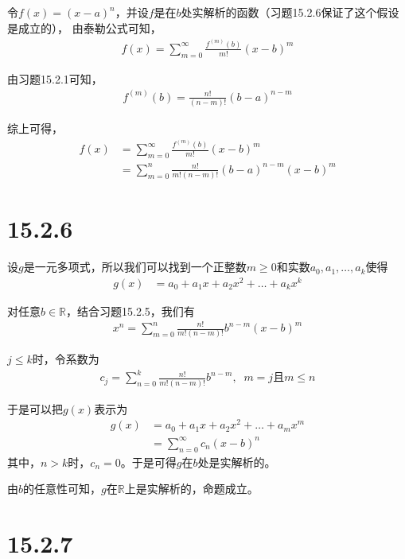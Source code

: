 \documentclass{article}
\begin{document}
令$f(x) = (x - a)^n$，并设$f$是在$b$处实解析的函数（习题15.2.6保证了这个假设是成立的），
由泰勒公式可知，
\begin{align*}
  f(x) = \sum\limits_{m = 0}^\infty \frac{f^{(m)}(b)}{m!}(x - b)^m
\end{align*}

由习题15.2.1可知，
\begin{align*}
  f^{(m)}(b) = \frac{n!}{(n - m)!}(b - a)^{n - m}
\end{align*}

综上可得，
\begin{align*}
  f(x) & = \sum\limits_{m = 0}^\infty \frac{f^{(m)}(b)}{m!}(x - b)^m            \\
       & = \sum\limits_{m = 0}^n \frac{n!}{m!(n - m)!} (b - a)^{n - m}(x - b)^m
\end{align*}

\section*{15.2.6}

设$g$是一元多项式，所以我们可以找到一个正整数$m \geq 0$和实数$a_0, a_1, \dots, a_k$使得
\begin{align*}
  g(x) & = a_0 + a_1x + a_2x^2 + \dots + a_kx^k
\end{align*}

对任意$b \in \mathbb{R}$，结合习题15.2.5，我们有
\begin{align*}
  x^n = \sum\limits_{m = 0}^n \frac{n!}{m!(n - m)!} b^{n - m}(x - b)^m
\end{align*}

$j \leq k$时，令系数为
\begin{align*}
  c_j = \sum\limits_{n = 0}^k \frac{n!}{m!(n - m)!} b^{n - m}, \;\; m = j \text{且} m \leq n
\end{align*}

于是可以把$g(x)$表示为
\begin{align*}
  g(x) & = a_0 + a_1x + a_2x^2 + \dots + a_mx^m    \\
       & = \sum\limits_{n = 0}^\infty c_n(x - b)^n
\end{align*}
其中，$n > k$时，$c_n = 0$。于是可得$g$在$b$处是实解析的。

由$b$的任意性可知，$g$在$\mathbb{R}$上是实解析的，命题成立。

\section*{15.2.7}
\end{document}
